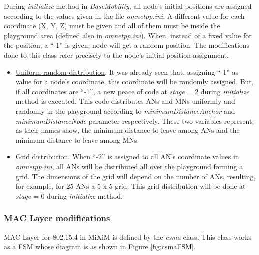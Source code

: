 During \textit{initialize} method in \textit{BaseMobility}, all node's initial positions are assigned according to the values given in the file
\textit{omnetpp.ini}. A different value for each coordinate (X, Y, Z) must be given and all of them must be inside the playground area (defined also
in \textit{omnetpp.ini}). When, instead of a fixed value for the position, a ``-1'' is given, node will get a random position. The modifications done to
this class refer precisely to the node's initial position assignment.

\begin{itemize}
 \item \underline{Uniform random distribution}. It was already seen that, assigning ``-1'' as value for a node's coordinate, this coordinate will be 
randomly assigned. But, if all coordinates are ``-1'', a new peace of code at \textit{stage} = 2 during \textit{initialize} method is executed. This 
code distributes \acp{AN} and \acp{MN} uniformly and randomly in the playground according to \textit{minimumDistanceAnchor} and 
\textit{minimumDistanceNode} parameter respectively. These two variables represent, as their names show, the minimum distance to leave among \acp{AN} 
and the minimum distance to leave among \acp{MN}.

 \item \underline{Grid distribution}. When ``-2'' is assigned to all \ac{AN}'s coordinate values in \textit{omnetpp.ini}, all \acp{AN} will be 
distributed all over the playground forming a grid. The dimensions of the grid will depend on the number of \acp{AN}, resulting, for example, for 25 
\acp{AN} a 5 x 5 grid. This grid distribution will be done at \textit{stage} = 0 during \textit{initialize} method.
\end{itemize}

\subsubsection{\ac{MAC} Layer modifications}
\label{sec:macmodifications}

\ac{MAC} Layer for 802.15.4 in \ac{MiXiM} is defined by the \textit{csma} class. This class works as a \ac{FSM} whose diagram is as shown in Figure 
\ref{fig:csmaFSM}.


